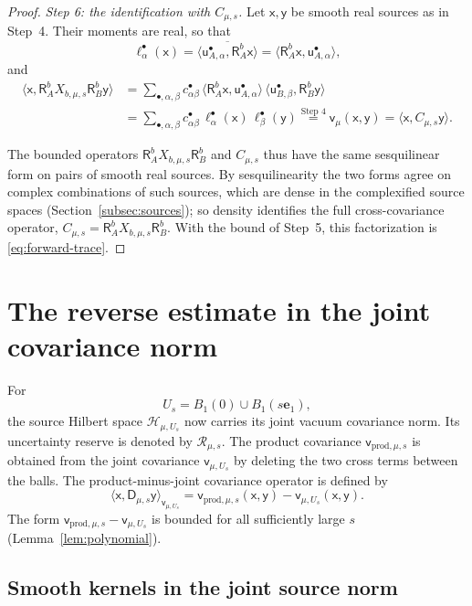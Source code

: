 \documentclass[11pt]{amsart}
\numberwithin{equation}{section}
\theoremstyle{definition}
\newcommand{\Hh}{\mathcal H}
\newcommand{\vv}{\mathsf v}
\newcommand{\Res}{\mathsf R}
\newcommand{\JointRes}{\mathcal R}
\newcommand{\JointD}{\mathsf D}
\newcommand{\sx}{\mathsf x}
\newcommand{\sy}{\mathsf y}
\newcommand{\eone}{\mathbf e_1}
\newcommand{\ip}[2]{\langle #1,#2\rangle}
\begin{document}
\begin{proof}
\smallskip
\emph{Step 6: the identification with \(C_{\mu,s}\).}
Let \(\sx,\sy\) be smooth real sources as in Step~4.
Their moments are real, so that
\[
 \ell^\bullet_\alpha(\sx)
 =\overline{\ip{\mathsf u^\bullet_{A,\alpha}}{\Res_A^b\sx}}
 =\ip{\Res_A^b\sx}{\mathsf u^\bullet_{A,\alpha}},
\]
and
\[
 \begin{split}
 \ip{\sx}{\Res_A^bX_{b,\mu,s}\Res_B^b\sy}
 &=\sum_{\bullet,\alpha,\beta}c^\bullet_{\alpha\beta}\,
 \ip{\Res_A^b\sx}{\mathsf u^\bullet_{A,\alpha}}\,
 \ip{\mathsf u^\bullet_{B,\beta}}{\Res_B^b\sy}\\
 &=\sum_{\bullet,\alpha,\beta}c^\bullet_{\alpha\beta}\,
 \ell^\bullet_\alpha(\sx)\,\ell^\bullet_\beta(\sy)
 \overset{\text{Step 4}}{=}\vv_\mu(\sx,\sy)
 =\ip{\sx}{C_{\mu,s}\sy}.
 \end{split}
\]

The bounded operators \(\Res_A^bX_{b,\mu,s}\Res_B^b\) and \(C_{\mu,s}\)
thus have the same sesquilinear form on pairs of smooth real sources. By
sesquilinearity the two forms agree on complex combinations of such
sources, which are dense in the complexified source spaces
(Section~\ref{subsec:sources}); so density identifies the full
cross-covariance operator, \(C_{\mu,s}=\Res_A^bX_{b,\mu,s}\Res_B^b\).
With the bound of Step~5, this factorization is
\eqref{eq:forward-trace}.
\end{proof}

\section{The reverse estimate in the joint covariance norm}
\label{sec:reverse}

For
\[
 U_s=B_1(0)\cup B_1(s\eone),
\]
the source Hilbert space \(\Hh_{\mu,U_s}\) now carries its joint vacuum
covariance norm. Its uncertainty reserve is denoted by
\(\JointRes_{\mu,s}\). The product covariance \(\vv_{\mathrm{prod},\mu,s}\)
is obtained from the joint covariance \(\vv_{\mu,U_s}\) by deleting the
two cross terms between the balls. The product-minus-joint
covariance operator is defined by
\begin{equation}
 \ip{\sx}{\JointD_{\mu,s}\sy}_{\vv_{\mu,U_s}}
 =
 \vv_{\mathrm{prod},\mu,s}(\sx,\sy)
 -\vv_{\mu,U_s}(\sx,\sy).
 \label{eq:D-joint}
\end{equation}
The form \(\vv_{\mathrm{prod},\mu,s}-\vv_{\mu,U_s}\) is bounded for all
sufficiently large \(s\) (Lemma~\ref{lem:polynomial}).

\subsection{Smooth kernels in the joint source norm}
\end{document}
